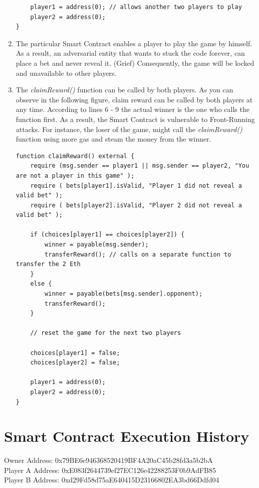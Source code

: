\documentclass[12pt,a4paper]{article}
\begin{document}
\begin{enumerate}
\begin{lstlisting}
    player1 = address(0); // allows another two players to play
    player2 = address(0);
}
\end{lstlisting}
    \item The particular Smart Contract enables a player to play the game by himself. As a result, 
    an adversarial entity that wants to stuck the code forever, can place a bet and never reveal it. (Grief)
    Consequently, the game will be locked and unavailable to other players.
    \item The \emph{claimReward()} function can be called by both players. As you can observe in 
    the following figure, claim reward can be called by both players at any time. According to lines
    6 - 9 the actual winner is the one who calls the function first. As a result, the Smart Contract
    is vulnerable to Front-Running attacks. For instance, the loser of the game, might call the
    \emph{claimReward()} function using more gas and steam the money from the winner. \\

\begin{lstlisting}
function claimReward() external {
    require (msg.sender == player1 || msg.sender == player2, "You are not a player in this game" );
    require ( bets[player1].isValid, "Player 1 did not reveal a valid bet" );
    require ( bets[player2].isValid, "Player 2 did not reveal a valid bet" );

    if (choices[player1] == choices[player2]) {
        winner = payable(msg.sender);
        transferReward(); // calls on a separate function to transfer the 2 Eth
    }
    else {
        winner = payable(bets[msg.sender].opponent);
        transferReward();
    }

    // reset the game for the next two players

    choices[player1] = false;
    choices[player2] = false;

    player1 = address(0);
    player2 = address(0);
}
\end{lstlisting}
\end{enumerate}

\section*{Smart Contract Execution History}

Owner Address: 0x79BE6e946368520419BF4A20aC45b28fd3a5b2bA \\
Player A Address: 0xE083f2644739ef27EC126e42288253F0b9AdFB85 \\
Player B Address: 0xd29Fd58d75aE640415D23166802EA3bd66Ddfd04 \\
\end{document}
